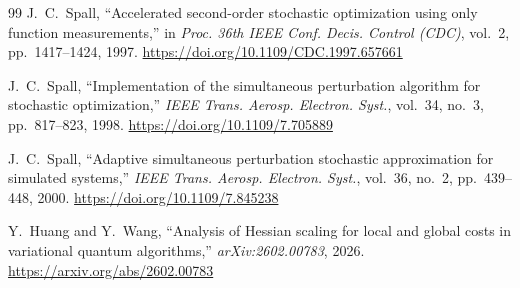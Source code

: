 \documentclass[sn-mathphys,Numbered]{sn-jnl}
\theoremstyle{thmstyleone}
\theoremstyle{thmstyletwo}
\theoremstyle{thmstylethree}
\begin{document}
\begin{thebibliography}{99}
J.~C.~Spall,
\newblock ``Accelerated second-order stochastic optimization using only function measurements,''
\newblock in \emph{Proc. 36th IEEE Conf. Decis. Control (CDC)}, vol.~2, pp.~1417--1424, 1997. \url{https://doi.org/10.1109/CDC.1997.657661}

J.~C.~Spall,
\newblock ``Implementation of the simultaneous perturbation algorithm for stochastic optimization,''
\newblock \emph{IEEE Trans. Aerosp. Electron. Syst.}, vol.~34, no.~3, pp.~817--823, 1998. \url{https://doi.org/10.1109/7.705889}

J.~C.~Spall,
\newblock ``Adaptive simultaneous perturbation stochastic approximation for simulated systems,''
\newblock \emph{IEEE Trans. Aerosp. Electron. Syst.}, vol.~36, no.~2, pp.~439--448, 2000. \url{https://doi.org/10.1109/7.845238}

Y.~Huang and Y.~Wang,
\newblock ``Analysis of Hessian scaling for local and global costs in variational quantum algorithms,''
\newblock \emph{arXiv:2602.00783}, 2026. \url{https://arxiv.org/abs/2602.00783}

\end{thebibliography}
\end{document}
